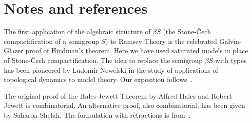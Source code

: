 \section{Notes and references}

The first application of the algebraic structure of $\beta S$ 
(the Stone-\v{C}ech compactification of a semigroup $S$) 
to Ramsey Theory is the celebrated Galvin-Glazer proof of Hindman's theorem. 
Here we have used saturated models in place of Stone-\v{C}ech compactification.
The idea to replace the semigroup $\beta S$ with types has been pioneered by Ludomir Newelski
in the study of applications of topological dynamics to model theory.
Our exposition follows~\cite{CZ}.

The original proof of the Hales-Jewett Theorem by Alfred Hales and Robert Jewett is combinatorial.
An alternative proof, also combinatorial, has been given by Saharon Shelah.
The formulation with retractions is from~\cite{Koppelberg}.

\begin{biblist}[]\normalsize
  \smallskip
  \end{biblist}

